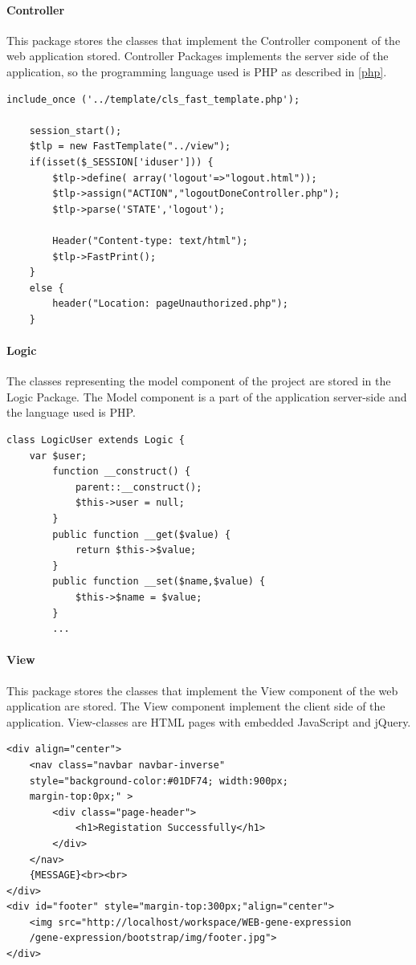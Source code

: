 \documentclass[a4paper]{report}
\begin{document}
\paragraph{Controller} This package stores the classes that implement the Controller component of the web application stored. Controller Packages implements the server side of the application, so the programming language used is PHP as described in \ref{php}.
\begin{lstlisting}[title={example of logoutController.php},frame=trBL]
include_once ('../template/cls_fast_template.php');
	
	session_start();
	$tlp = new FastTemplate("../view");
	if(isset($_SESSION['iduser'])) {
		$tlp->define( array('logout'=>"logout.html"));
		$tlp->assign("ACTION","logoutDoneController.php");
		$tlp->parse('STATE','logout');
	
		Header("Content-type: text/html");
		$tlp->FastPrint();
	}
	else {
		header("Location: pageUnauthorized.php");
	}
\end{lstlisting}



\paragraph{Logic} The classes representing the model component of the project are stored in the Logic Package. The Model component is a part of the application server-side and the language used is PHP.
\begin{lstlisting}[title={Fragment of logicUser.php},frame=trBL]	
class LogicUser extends Logic {
	var $user;
		function __construct() {
			parent::__construct();
			$this->user = null;	
		}
		public function __get($value) {
			return $this->$value;
		}
		public function __set($name,$value) {
			$this->$name = $value;
		}	
		...
\end{lstlisting}

\paragraph{View} This package stores the classes that implement the View component of the web application  are stored. The View component implement the client side of the application. View-classes are HTML pages with embedded JavaScript and jQuery.
\begin{lstlisting}[title={login.html's body.},frame=trBL]	
<div align="center">
	<nav class="navbar navbar-inverse"
	style="background-color:#01DF74; width:900px;
	margin-top:0px;" >
  		<div class="page-header">
  			<h1>Registation Successfully</h1>
		</div>
	</nav>
	{MESSAGE}<br><br>
</div>
<div id="footer" style="margin-top:300px;"align="center">
	<img src="http://localhost/workspace/WEB-gene-expression
	/gene-expression/bootstrap/img/footer.jpg">
</div>
\end{lstlisting}
\end{document}
